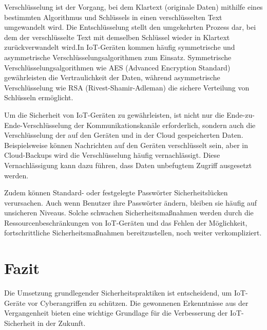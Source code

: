 \documentclass[12pt, parskip]{scrartcl}
\begin{document}
Verschlüsselung ist der Vorgang, bei dem Klartext (originale Daten) mithilfe eines bestimmten Algorithmus und Schlüssels in einen verschlüsselten Text umgewandelt wird. Die Entschlüsselung stellt den umgekehrten Prozess dar, bei dem der verschlüsselte Text mit demselben Schlüssel wieder in Klartext zurückverwandelt wird.In IoT-Geräten kommen häufig symmetrische und asymmetrische Verschlüsselungsalgorithmen zum Einsatz. Symmetrische Verschlüsselungsalgorithmen wie AES (Advanced Encryption Standard) gewährleisten die Vertraulichkeit der Daten, während asymmetrische Verschlüsselung wie RSA (Rivest-Shamir-Adleman) die sichere Verteilung von Schlüsseln ermöglicht.

Um die Sicherheit von IoT-Geräten zu gewährleisten, ist nicht nur die Ende-zu-Ende-Verschlüsselung der Kommunikationskanäle erforderlich, sondern auch die Verschlüsselung der auf den Geräten und in der Cloud gespeicherten Daten. Beispielsweise können Nachrichten auf den Geräten verschlüsselt sein, aber in Cloud-Backups wird die Verschlüsselung häufig vernachlässigt. Diese Vernachlässigung kann dazu führen, dass Daten unbefugtem Zugriff ausgesetzt werden.\cite{Gilchrist_2017}

Zudem können Standard- oder festgelegte Passwörter Sicherheitslücken verursachen. Auch wenn Benutzer ihre Passwörter ändern, bleiben sie häufig auf unsicheren Niveaus. Solche schwachen Sicherheitsmaßnahmen werden durch die Ressourcenbeschränkungen von IoT-Geräten und das Fehlen der Möglichkeit, fortschrittliche Sicherheitsmaßnahmen bereitzustellen, noch weiter verkompliziert.\cite{2020}

\section{Fazit}

Die Umsetzung grundlegender Sicherheitspraktiken ist entscheidend, um IoT-Geräte vor Cyberangriffen zu schützen. Die gewonnenen Erkenntnisse aus der Vergangenheit bieten eine wichtige Grundlage für die Verbesserung der IoT-Sicherheit in der Zukunft.

\printbibliography
\end{document}
